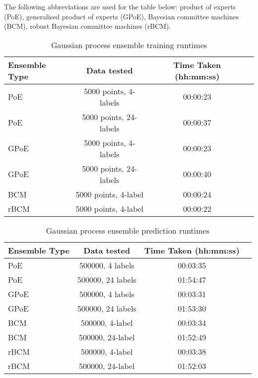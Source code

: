 The following abbreviations are used for the table below: product of experts (PoE), generalised product of experts (GPoE), Bayesian committee machines (BCM), robust Bayesian committee machines (rBCM).
\begin{table}[H]
    \centering
    \begin{tabular}{|C{3cm}|c|c|C{3cm}|}
        \hline
        Ensemble Type & Data tested & Time Taken (hh:mm:ss) \\\hline
        PoE   & 5000 points, 4-labels   &  00:00:23 \\
        PoE   & 5000 points, 24-labels  &  00:00:37 \\
        GPoE  & 5000 points, 4-labels   &  00:00:23 \\
        GPoE  & 5000 points, 24-labels  &  00:00:40 \\
        BCM   & 5000 points, 4-label    &  00:00:24 \\
        rBCM  & 5000 points, 4-label    &  00:00:22 \\
        \hline
    \end{tabular}
    \label{table:gpensemble-training}
    \caption{Gaussian process ensemble training runtimes}
\end{table}

\begin{table}[H]
    \centering
    \begin{tabular}{|C{3cm}|c|c|C{3cm}|}
        \hline
        Ensemble Type & Data tested & Time Taken (hh:mm:ss) \\\hline
        PoE   & 500000, 4 labels    & 00:03:35 \\
        PoE   & 500000, 24 labels   & 01:54:47 \\
        GPoE  & 500000, 4 labels    & 00:03:31 \\
        GPoE  & 500000, 24 labels   & 01:53:30 \\
        BCM   & 500000, 4-label     & 00:03:34 \\
        BCM   & 500000, 24-label    & 01:52:49 \\
        rBCM  & 500000, 4-label     & 00:03:38 \\
        rBCM  & 500000, 24-label    & 01:52:03 \\
        \hline
    \end{tabular}
    \label{table:gpensemble-predictions}
    \caption{Gaussian process ensemble prediction runtimes}
\end{table}

